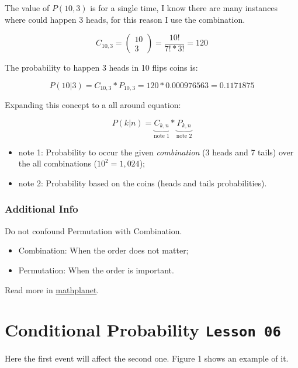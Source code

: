 \documentclass[]{book}
\providecommand{\tightlist}{%
  \setlength{\itemsep}{0pt}\setlength{\parskip}{0pt}}
\begin{document}
The value of \(P(10,3)\) is for a single time, I know there are many
instances where could happen 3 heads, for this reason I use the
combination.

\[ C_{10,3} = \begin{pmatrix} 10 \\ 3 \end{pmatrix} = \frac{10!}{7!*3!} = 120\]

The probability to happen 3 heads in 10 flips coins is:

\[ P(10|3) = C_{10,3} * P_{10,3} = 120 * 0.000976563 = 0.1171875 \]

Expanding this concept to a all around equation:

\[ P(k|n) = \underbrace{C_{k,n}}_{\text{note 1}} * \underbrace{P_{k,n}}_{\text{note 2}} \tag{5}\]

\begin{itemize}
\tightlist
\item
  note 1: Probability to occur the given \emph{combination} (3 heads and
  7 tails) over the all combinations (\(10^2 = 1,024\));
\item
  note 2: Probability based on the coins (heads and tails
  probabilities).
\end{itemize}

\subsubsection{Additional Info}\label{additional-info}

Do not confound Permutation with Combination.

\begin{itemize}
\tightlist
\item
  Combination: When the order does not matter;
\item
  Permutation: When the order is important.
\end{itemize}

Read more in
\href{https://www.mathplanet.com/education/algebra-2/discrete-mathematics-and-probability/permutations-and-combinations}{mathplanet}.

\section{\texorpdfstring{Conditional Probability
\texttt{Lesson\ 06}}{Conditional Probability Lesson 06}}\label{conditional-probability-lesson-06}

Here the first event will affect the second one. Figure 1 shows an
example of it.
\end{document}
